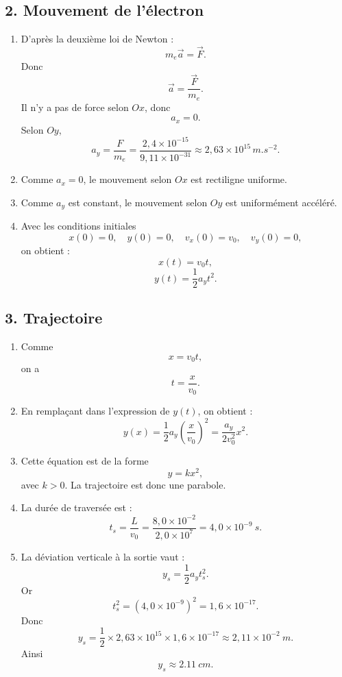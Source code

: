\documentclass[11pt,a4paper]{article}
\begin{document}
\subsection*{2. Mouvement de l'électron}

\begin{enumerate}
    \item D'après la deuxième loi de Newton :
    \[
    m_e\vec a=\vec F.
    \]
    Donc
    \[
    \vec a=\frac{\vec F}{m_e}.
    \]
    Il n'y a pas de force selon \(Ox\), donc
    \[
    a_x=0.
    \]
    Selon \(Oy\),
    \[
    a_y=\frac{F}{m_e}
    =\frac{2{,}4\times10^{-15}}{9{,}11\times10^{-31}}
    \approx 2{,}63\times10^{15}\,\si{m.s^{-2}}.
    \]

    \item Comme \(a_x=0\), le mouvement selon \(Ox\) est rectiligne uniforme.

    \item Comme \(a_y\) est constant, le mouvement selon \(Oy\) est uniformément accéléré.

    \item Avec les conditions initiales
    \[
    x(0)=0,\quad y(0)=0,\quad v_x(0)=v_0,\quad v_y(0)=0,
    \]
    on obtient :
    \[
    x(t)=v_0t,
    \]
    \[
    y(t)=\frac12 a_y t^2.
    \]
\end{enumerate}

\subsection*{3. Trajectoire}

\begin{enumerate}
    \item Comme
    \[
    x=v_0t,
    \]
    on a
    \[
    t=\frac{x}{v_0}.
    \]

    \item En remplaçant dans l'expression de \(y(t)\), on obtient :
    \[
    y(x)=\frac12 a_y\left(\frac{x}{v_0}\right)^2
    =\frac{a_y}{2v_0^2}x^2.
    \]

    \item Cette équation est de la forme
    \[
    y=kx^2,
    \]
    avec \(k>0\). La trajectoire est donc une parabole.

    \item La durée de traversée est :
    \[
    t_s=\frac{L}{v_0}
    =\frac{8{,}0\times10^{-2}}{2{,}0\times10^7}
    =4{,}0\times10^{-9}\ \si{s}.
    \]

    \item La déviation verticale à la sortie vaut :
    \[
    y_s=\frac12 a_y t_s^2.
    \]
    Or
    \[
    t_s^2=(4{,}0\times10^{-9})^2=1{,}6\times10^{-17}.
    \]
    Donc
    \[
    y_s=\frac12\times2{,}63\times10^{15}\times1{,}6\times10^{-17}
    \approx 2{,}11\times10^{-2}\ \si{m}.
    \]
    Ainsi
    \[
    y_s\approx \SI{2.11}{cm}.
    \]
\end{enumerate}
\end{document}
